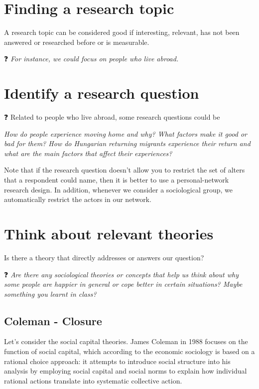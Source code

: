 \documentclass[
  notitlepage,
  onecolumn,
  openany]{book}
\begin{document}
\hypertarget{finding-a-research-topic}{%
\section{Finding a research topic}\label{finding-a-research-topic}}

A research topic can be considered good if interesting, relevant, has not been answered or researched before or is measurable.

❓ \emph{For instance, we could focus on people who live abroad.}

\hypertarget{identify-a-research-question}{%
\section{Identify a research question}\label{identify-a-research-question}}

❓ Related to people who live abroad, some research questions could be

\emph{How do people experience moving home and why? What factors make it good or bad for them? How do Hungarian returning migrants experience their return and what are the main factors that affect their experiences?}

Note that if the research question doesn't allow you to restrict the set of alters that a respondent could name, then it is better to use a personal-network research design. In addition, whenever we consider a sociological group, we automatically restrict the actors in our network.

\hypertarget{think-about-relevant-theories}{%
\section{Think about relevant theories}\label{think-about-relevant-theories}}

Is there a theory that directly addresses or answers our question?

❓ \emph{Are there any sociological theories or concepts that help us think about why some people are happier in general or cope better in certain situations? Maybe something you learnt in class?}

\hypertarget{coleman---closure}{%
\subsection{Coleman - Closure}\label{coleman---closure}}

Let's consider the social capital theories. James Coleman in 1988 focuses on the function of social capital, which according to the economic sociology is based on a rational choice approach: it attempts to introduce social structure into his analysis by employing social capital and social norms to explain how individual rational actions translate into systematic collective action.
\end{document}

